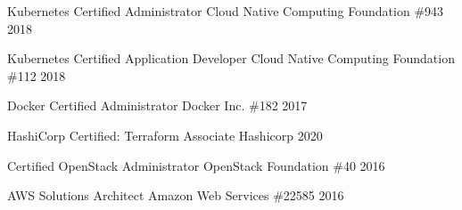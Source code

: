 

\begin{cvhonors}

  \cvhonor
    {Kubernetes Certified Administrator}
    {Cloud Native Computing Foundation}
    {\#943}
    {2018} %

  \cvhonor
    {Kubernetes Certified Application Developer}
    {Cloud Native Computing Foundation}
    {\#112}
    {2018} %

  \cvhonor
    {Docker Certified Administrator}
    {Docker Inc.}
    {\#182}
    {2017} %

  \cvhonor
    {HashiCorp Certified: Terraform Associate}
    {Hashicorp}
    {}
    {2020} %

  \cvhonor
    {Certified OpenStack Administrator}
    {OpenStack Foundation}
    {\#40}
    {2016} %

  \cvhonor
    {AWS Solutions Architect}
    {Amazon Web Services}
    {\#22585}
    {2016} %


\end{cvhonors}
